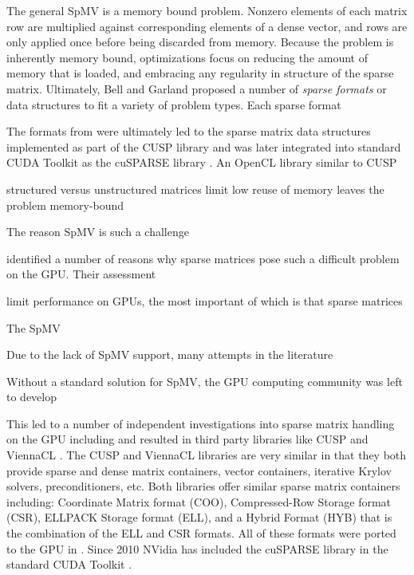 \documentclass{report}
\begin{document}
The general SpMV is a memory bound problem. Nonzero elements of each matrix row are multiplied against corresponding elements of a dense vector, and rows are only applied once before being discarded from memory. Because the problem is inherently memory bound, optimizations focus on reducing the amount of memory that is loaded, and embracing any regularity in structure of the sparse matrix. Ultimately, Bell and Garland proposed a number of \emph{sparse formats} or data structures to fit a variety of problem types. Each sparse format 

The formats from \cite{Bell2009} were ultimately led to the sparse matrix data structures implemented as part of the CUSP library \cite{Cusp2012} and was later integrated into standard CUDA Toolkit as the cuSPARSE library \cite{CudaToolkitDoc}. An OpenCL library similar to CUSP

structured versus unstructured matrices limit 
low reuse of memory leaves the problem memory-bound


The reason SpMV is such a challenge






identified a number of reasons why sparse matrices pose such a difficult problem on the GPU. Their assessment 

 limit performance on GPUs, the most important of which is that sparse matrices  


The SpMV 

Due to the lack of SpMV support, many attempts in the literature 



Without a standard solution for SpMV, the GPU computing community was left to develop 


This led to a number of independent investigations into sparse matrix handling on the GPU including \cite{SuKeutzer2012,Kreutzer2012} and resulted in third party libraries like CUSP \cite{Cusp2012} and ViennaCL \cite{Rupp2010,Rupp2010a}. The CUSP and ViennaCL libraries are very similar in that they both provide sparse and dense matrix containers, vector containers, iterative Krylov solvers, preconditioners, etc. Both libraries offer similar sparse matrix containers including: Coordinate Matrix format (COO), Compressed-Row Storage format (CSR), ELLPACK Storage format (ELL), and a Hybrid Format (HYB) that is the combination of the ELL and CSR formats. All of these formats were ported to the GPU in \cite{Bell2009}. Since 2010 NVidia has included the cuSPARSE library in the standard CUDA Toolkit \cite{CudaToolkitDoc}.  
\end{document}
